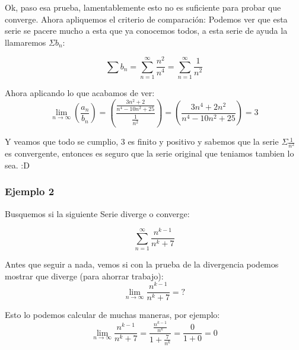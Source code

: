 \documentclass[12pt]{report}                                %
\begin{document}
            Ok, paso esa prueba, lamentablemente esto no es
            suficiente para probar que converge.
            Ahora apliquemos el criterio de comparación: Podemos ver que esta serie se pacere mucho a esta que ya conocemos todos, a esta serie de ayuda la llamaremos $\Sigma b_n$:

            \begin{equation*}
                \sum b_n = \sum_{n=1}^{\infty} \frac{n^2}{n^4} = \sum_{n=1}^{\infty} \frac{1}{n^2}
            \end{equation*}

            Ahora aplicando lo que acabamos de ver:
            \begin{equation*}
                \lim_{n \to \infty} \left( \frac{a_n}{b_n} \right) = \left( \frac{ \frac{3n^2+2}{n^4-10n^2+25} }{ \frac{1}{n^2} } \right) =  \left( \frac{3n^4+2n^2}{n^4-10n^2+25} \right) = 3
            \end{equation*}

            Y veamos que todo se cumplio, 3 es finito y positivo y sabemos que la serie $\Sigma \frac{1}{n^2}$ es convergente, entonces es seguro que la serie original que teniamos tambien lo sea. :D


        \subsubsection{Ejemplo 2}
            Busquemos si la siguiente Serie diverge o converge:

            \begin{equation*}
                \sum_{n=1}^{\infty} \frac{n^{k-1}}{n^k+7}
            \end{equation*}
             
            Antes que seguir a nada, vemos si con la prueba de la divergencia podemos mostrar que diverge (para ahorrar trabajo):
            \begin{equation*}
                \lim_{n \to \infty} \frac{n^{k-1}}{n^k+7} = ?
            \end{equation*}

            Esto lo podemos calcular de muchas maneras, por ejemplo:
            \begin{equation*}
                \lim_{n \to \infty} \frac{n^{k-1}}{n^k+7} = \frac{ \frac{n^{k-1}}{n^k} }{1+\frac{7}{n^k}} = \frac{0}{1+0} = 0
            \end{equation*}
\end{document}
